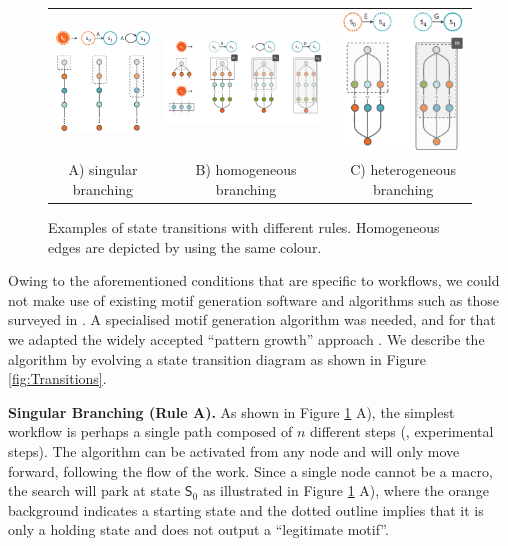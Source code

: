 \begin{figure}[t!]
\centering
\begin{tabular}{@{}ccc@{}}
\includegraphics[width=37mm]{images/automacron/States1.eps}&
\includegraphics[height=37mm]{images/automacron/States2.pdf}&
\includegraphics[height=37mm]{images/automacron/States3.eps}\\
A) singular branching & B) homogeneous branching & C) heterogeneous branching
\end{tabular}
\caption{Examples of state transitions with different rules. Homogeneous edges are depicted by using the same colour.}
\label{fig:States}
\end{figure}

Owing to the aforementioned conditions that are specific to workflows, we could not make use of existing motif generation software and algorithms such as those surveyed in \cite{Wong:2012}.
A specialised motif generation algorithm was needed, and for that we adapted the widely accepted ``pattern growth'' approach \cite{Wong:2012}.
We describe the algorithm by evolving a state transition diagram as shown in Figure \ref{fig:Transitions}.

\noindent \textbf{Singular Branching (Rule A).}
%
As shown in Figure \ref{fig:States} A), the simplest workflow is perhaps a single path composed of $n$ different steps (\eg, experimental steps).
The algorithm can be activated from any node and will only move forward, following the flow of the work.
Since a single node cannot be a macro, the search will park at state $\mathsf{S}_0$ as illustrated in Figure \ref{fig:States} A), where the orange background indicates a starting state and the dotted outline implies that it is only a holding state and does not output a ``legitimate motif''.

